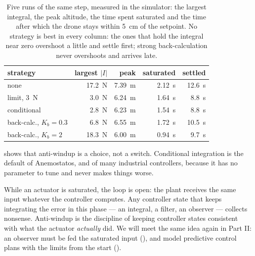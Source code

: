 \begin{table}[h]
\centering\small\sffamily
\begin{tabular}{lrrrr}
\toprule
strategy & largest $|I|$ & peak & saturated & settled\\
\midrule
none & \SI{17.2}{N} & \SI{7.39}{m} & \SI{2.12}{s} & \SI{12.6}{s}\\
limit, \SI{3}{N} & \SI{3.0}{N} & \SI{6.24}{m} & \SI{1.64}{s} & \SI{8.8}{s}\\
conditional & \SI{2.8}{N} & \SI{6.23}{m} & \SI{1.54}{s} & \SI{8.8}{s}\\
back-calc., $K_b = 0.3$ & \SI{6.8}{N} & \SI{6.55}{m} & \SI{1.72}{s} & \SI{10.5}{s}\\
back-calc., $K_b = 2$ & \SI{18.3}{N} & \SI{6.00}{m} & \SI{0.94}{s} & \SI{9.7}{s}\\
\bottomrule
\end{tabular}
\caption{Five runs of the same step, measured in the simulator: the largest integral, the peak altitude, the time spent saturated and the time after which the drone stays within \SI{5}{cm} of the setpoint. No strategy is best in every column: the ones that hold the integral near zero overshoot a little and settle first; strong back-calculation never overshoots and arrives late.}
\label{tab:windup}
\end{table}

 shows that anti-windup is a choice, not a switch. Conditional integration is the default of Anemostatos, and of many industrial controllers, because it has no parameter to tune and never makes things worse.

\begin{keyidea}
While an actuator is saturated, the loop is open: the plant receives the same input whatever the controller computes. Any controller state that keeps integrating the error in this phase — an integral, a filter, an observer — collects nonsense. Anti-windup is the discipline of keeping controller states consistent with what the actuator \emph{actually} did. We will meet the same idea again in Part II: an observer must be fed the saturated input (), and model predictive control plans with the limits from the start ().
\end{keyidea}


